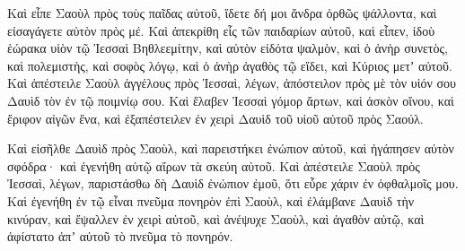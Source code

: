 {Καὶ εἶπε Σαοὺλ πρὸς τοὺς παῖδας αὐτοῦ, ἴδετε δή μοι ἄνδρα ὀρθῶς ψάλλοντα, καὶ εἰσαγάγετε αὐτὸν πρὸς μέ.
Καὶ ἀπεκρίθη εἷς τῶν παιδαρίων αὐτοῦ, καὶ εἶπεν, ἰδοὺ ἑώρακα υἱὸν τῷ Ἰεσσαὶ Βηθλεεμίτην, καὶ αὐτὸν εἰδότα ψαλμὸν, καὶ ὁ ἀνὴρ συνετὸς, καὶ πολεμιστὴς, καὶ σοφὸς λόγῳ, καὶ ὁ ἀνὴρ ἀγαθὸς τῷ εἴδει, καὶ Κύριος μετʼ αὐτοῦ.
Καὶ ἀπέστειλε Σαοὺλ ἀγγέλους πρὸς Ἰεσσαὶ, λέγων, ἀπόστειλον πρὸς μὲ τὸν υἱόν σου Δαυὶδ τὸν ἐν τῷ ποιμνίῳ σου.
Καὶ ἔλαβεν Ἰεσσαὶ γόμορ ἄρτων, καὶ ἀσκὸν οἴνου, καὶ ἔριφον αἰγῶν ἕνα, καὶ ἐξαπέστειλεν ἐν χειρὶ Δαυὶδ τοῦ υἱοῦ αὐτοῦ πρὸς Σαούλ.
\par }{\PP {}Καὶ εἰσῆλθε Δαυὶδ πρὸς Σαοὺλ, καὶ παρειστήκει ἐνώπιον αὐτοῦ, καὶ ἠγάπησεν αὐτὸν σφόδρα· καὶ ἐγενήθη αὐτῷ αἴρων τὰ σκεύη αὐτοῦ.
Καὶ ἀπέστειλε Σαοὺλ πρὸς Ἰεσσαὶ, λέγων, παριστάσθω δὴ Δαυὶδ ἐνώπιον ἐμοῦ, ὅτι εὗρε χάριν ἐν ὀφθαλμοῖς μου.
Καὶ ἐγενήθη ἐν τῷ εἶναι πνεῦμα πονηρὸν ἐπὶ Σαοὺλ, καὶ ἐλάμβανε Δαυὶδ τὴν κινύραν, καὶ ἔψαλλεν ἐν χειρὶ αὐτοῦ, καὶ ἀνέψυχε Σαοὺλ, καὶ ἀγαθὸν αὐτῷ, καὶ ἀφίστατο ἀπʼ αὐτοῦ τὸ πνεῦμα τὸ πονηρόν.

}
